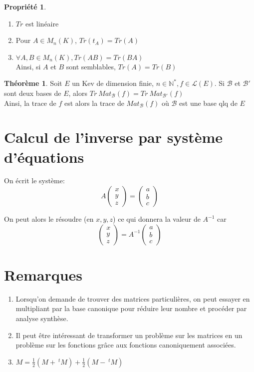 \documentclass[fleqn]{article}
\theoremstyle{definition} \newtheorem*{defi}{D\'efinition}
\theoremstyle{definition} \newtheorem*{theo}{Th\'eor\`eme}
\theoremstyle{definition} \newtheorem*{coro}{Corollaire}
\theoremstyle{definition} \newtheorem*{nota}{Notation}
\theoremstyle{definition} \newtheorem*{vocab}{Vocabulaire}
\theoremstyle{remark} \newtheorem*{rqs}{Remarques}
\theoremstyle{definition} \newtheorem*{prop}{Propri\'et\'e}
\begin{document}
\begin{prop} $ $
	\begin{enumerate}
		\item $Tr$ est lin\'eaire
		\item Pour $A \in M_n(K)$, $Tr(t_A) = Tr(A)$
		\item $\forall A,B \in M_n(K), Tr(AB) = Tr(BA)$ \\
			Ainsi, si $A$ et $B$ sont semblables, $Tr(A) = Tr(B)$
	\end{enumerate}
\end{prop}

\begin{theo}
	Soit $E$ un Kev de dimension finie, $n \in \mathbb{N}^*, f \in \mathscr{L}(E)$. Si $\mathscr{B}$ et $\mathscr{B}'$ sont deux bases de $E$,
	alors $Tr\ Mat_{\mathscr{B}}(f) = Tr\ Mat_{\mathscr{B}'}(f)$ \\
	Ainsi, la trace de $f$ est alors la trace de $Mat_{\mathscr{B}}(f)$ o\`u $\mathscr{B}$ est une base qlq de $E$
\end{theo}

\section{Calcul de l'inverse par syst\`eme d'\'equations}
On \'ecrit le syst\`eme: \[A \begin{pmatrix} x \\ y \\ z \end{pmatrix} = \begin{pmatrix} a \\ b \\ c \end{pmatrix}\]

On peut alors le r\'esoudre (en $x,y,z$) ce qui donnera la valeur de $A^{-1}$ car
\[\begin{pmatrix} x \\ y \\ z \end{pmatrix} = A^{-1} \begin{pmatrix} a \\ b \\ c \end{pmatrix}\]

\section{Remarques}

\begin{enumerate}
	\item Lorsqu'on demande de trouver des matrices particuli\`eres, on peut essayer en multipliant par la base canonique pour r\'eduire leur
		nombre et proc\'eder par analyse synth\`ese.
	\item Il peut \^etre int\'eressant de transformer un probl\`eme sur les matrices en un probl\`eme sur les fonctions gr\^ace aux fonctions
		canoniquement associ\'ees.
	\item $M = \frac{1}{2}(M +\ ^t M) + \frac{1}{2}(M -\ ^t M)$
\end{enumerate}
\end{document}
